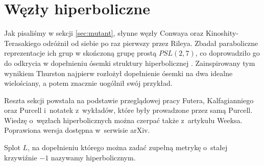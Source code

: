 \section{Węzły hiperboliczne} %
\label{sec:hyperbolic}
Jak pisaliśmy w sekcji \ref{sec:mutant}, słynne węzły Conwaya oraz Kinoshity-Terasakiego odróżnił od siebie po raz pierwszy przez Rileya.
Zbadał paraboliczne reprezentacje ich grup w skończoną grupę prostą $PSL(2, 7)$, co doprowadziło go do odkrycia w dopełnieniu ósemki struktury hiperbolicznej \cite{riley75}.
Zainspirowany tym wynikiem Thurston najpierw rozłożył dopełnienie ósemki na dwa idealne wielościany, a potem znacznie uogólnił swój przykład.

Reszta sekcji powstała na podstawie przeglądowej pracy \cite{purcell19} Futera, Kalfagianniego oraz Purcell i~notatek z~wykładów, które były prowadzone przez samą Purcell.
Wiedzę o~węzłach hiperbolicznych można czerpać także z~artykułu \cite{weeks05} Weeksa.
Poprawiona wersja dostępna w~serwisie arXiv.








\begin{definition}[hiperboliczny]
    Splot $L$, na dopełnieniu którego można zadać zupełną metrykę o~stałej krzywiźnie $-1$ nazywamy hiperbolicznym.
\end{definition}


